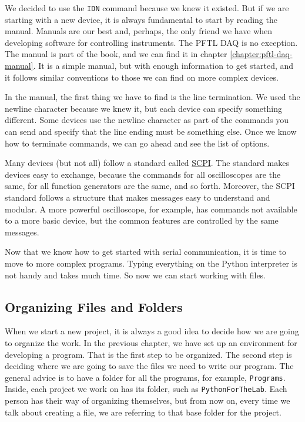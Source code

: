 We decided to use the \texttt{IDN} command because we knew it existed. But if we are starting with a new device, it is always fundamental to start by reading the manual. Manuals are our best and, perhaps, the only friend we have when developing software for controlling instruments. The {PFTL DAQ} is no exception. The manual is part of the book, and we can find it in chapter \ref{chapter:pftl-daq-manual}. It is a simple manual, but with enough information to get started, and it follows similar conventions to those we can find on more complex devices.

In the manual, the first thing we have to find is the line termination. We used the newline character because we knew it, but each device can specify something different. Some devices use the newline character as part of the commands you can send and specify that the line ending must be something else. Once we know how to terminate commands, we can go ahead and see the list of options.

Many devices (but not all) follow a standard called \href{https://en.wikipedia.org/wiki/Standard_Commands_for_Programmable_Instruments}{SCPI}. The standard makes devices easy to exchange, because the commands for all oscilloscopes are the same, for all function generators are the same, and so forth. Moreover, the SCPI standard follows a structure that makes messages easy to understand and modular. A more powerful oscilloscope, for example, has commands not available to a more basic device, but the common features are controlled by the same messages.

Now that we know how to get started with serial communication, it is time to move to more complex programs. Typing everything on the Python interpreter is not handy and takes much time. So now we can start working with files.

\subsection{Organizing Files and Folders}
When we start a new project, it is always a good idea to decide how we are going to organize the work. In the previous chapter, we have set up an environment for developing a program. That is the first step to be organized. The second step is deciding where we are going to save the files we need to write our program. The general advice is to have a folder for all the programs, for example, \texttt{Programs}. Inside, each project we work on has its folder, such as \texttt{PythonForTheLab}. Each person has their way of organizing themselves, but from now on, every time we talk about creating a file, we are referring to that base folder for the project.


